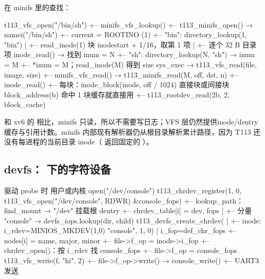 在 minifs 里的查找：

\begin{txtcode}
t113_vfs_open("/bin/sh")
+-- minifs_vfs_lookup()
    +-- t113_minifs_open() → namei("/bin/sh")
        +-- current = ROOTINO (1)
        +-- "bin": directory_lookup(1, "bin")
        |   +-- read_inode(1)          块 inodestart + 1/16，取第 1 项
        |   +-- 逐个 32 B 目录项 inode_read() → 找到 inum = N
        +-- "sh":  directory_lookup(N, "sh") → inum = M
        +-- *inum = M；read_inode(M) 得到 size
sys_exec → t113_vfs_read(file, image, size)
+-- minifs_vfs_read() → t113_minifs_read(M, off, dst, n)
    +-- inode_read()
        +-- 每块：inode_block(inode, off / 1024)       直接块或间接块
                  block_address(b)                     命中 1 块缓存就直接用
                  +-- t113_rootdev_read(2b, 2, block_cache)
\end{txtcode}

和 xv6 的  相比，minifs 只读，所以不需要写日志；VFS 层仍然提供inode/dentry 缓存与引用计数。minifs 内部现有解析器仍从根目录解析累计路径，因为 T113 还没有每进程的当前目录 inode（ 返回固定的 \file{/}）。

\subsection{devfs： 下的字符设备}

\begin{txtcode}[basicstyle=\ttfamily\scriptsize]
驱动 probe 时                           用户或内核 open("/dev/console")
t113_chrdev_register(1, 0,              t113_vfs_open("/dev/console", RDWR)
                     &console_fops)     +-- lookup_path：find_mount → "/dev" 挂载根 dentry
+-- chrdev_table[i] = { dev, fops }     |   +-- 分量 "console" → devfs_iops.lookup(dir, child)
t113_devfs_create_chrdev(               |       +-- inode: i_rdev=MINIOS_MKDEV(1,0)
   "console", 1, 0)                     |           i_fop=def_chr_fops
+-- nodes[i] = { name, major, minor }   +-- file->f_op = inode->i_fop
                                        +-- chrdev_open()：按 i_rdev 找 console_fops
                                            +-- file->f_op = console_fops
                                        t113_vfs_write(f, "hi", 2)
                                        +-- file->f_op->write() → console_write()
                                            +-- UART3 发送
\end{txtcode}

